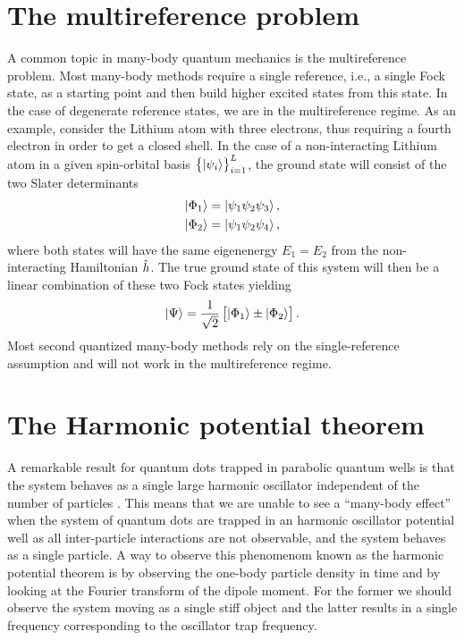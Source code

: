     \section{The multireference problem}
        A common topic in many-body quantum mechanics is the multireference
        problem.
        Most many-body methods require a single reference, i.e., a single Fock
        state, as a starting point and then build higher excited states from
        this state.
        In the case of degenerate reference states, we are in the multireference
        regime.
        As an example, consider the Lithium atom with three electrons, thus
        requiring a fourth electron in order to get a closed shell.
        In the case of a non-interacting Lithium atom in a given spin-orbital
        basis $\left\{ \ket{\psi_i} \right\}_{i = 1}^{L}$, the ground state will consist
        of the two Slater determinants
        \begin{align}
            \ket{\Phi_1} &= \ket{\psi_1\psi_2\psi_3}, \\
            \ket{\Phi_2} &= \ket{\psi_1\psi_2\psi_4},
        \end{align}
        where both states will have the same eigenenergy $E_1 = E_2$ from the
        non-interacting Hamiltonian $\hat{h}$.
        The true ground state of this system will then be a linear combination
        of these two Fock states yielding
        \begin{align}
            \ket{\Psi}
            = \frac{1}{\sqrt{2}}\left[ 
                \ket{\Phi_1}
                \pm
                \ket{\Phi_2}
             \right].
        \end{align}
        Most second quantized many-body methods rely on the single-reference
        assumption and will not work in the multireference regime.

    \section{The Harmonic potential theorem}
        \label{sec:hpt}
        A remarkable result for quantum dots trapped in parabolic quantum wells
        is that the system behaves as a single large harmonic oscillator
        independent of the number of particles \cite{kohn, brey}.
        This means that we are unable to see a ``many-body effect'' when the
        system of quantum dots are trapped in an harmonic oscillator potential
        well as all inter-particle interactions are not observable, and the
        system behaves as a single particle.
        A way to observe this phenomenom known as the harmonic potential theorem
        is by observing the one-body particle density in time and by looking at
        the Fourier transform of the dipole moment.
        For the former we should observe the system moving as a single stiff
        object and the latter results in a single frequency corresponding to the
        oscillator trap frequency.
